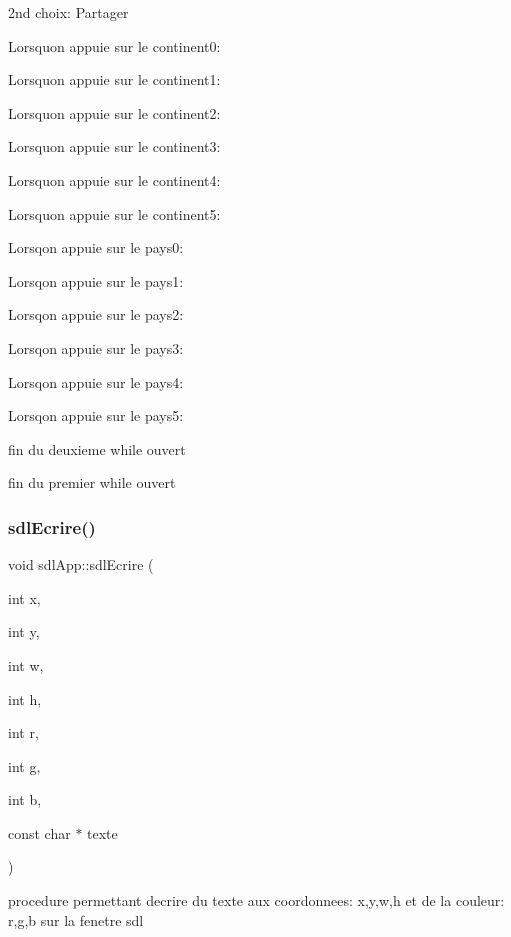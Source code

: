 2nd choix\+: Partager

Lorsqu\textquotesingle{}on appuie sur le continent0\+:

Lorsqu\textquotesingle{}on appuie sur le continent1\+:

Lorsqu\textquotesingle{}on appuie sur le continent2\+:

Lorsqu\textquotesingle{}on appuie sur le continent3\+:

Lorsqu\textquotesingle{}on appuie sur le continent4\+:

Lorsqu\textquotesingle{}on appuie sur le continent5\+:

Lorsq\textquotesingle{}on appuie sur le pays0\+:

Lorsq\textquotesingle{}on appuie sur le pays1\+:

Lorsq\textquotesingle{}on appuie sur le pays2\+:

Lorsq\textquotesingle{}on appuie sur le pays3\+:

Lorsq\textquotesingle{}on appuie sur le pays4\+:

Lorsq\textquotesingle{}on appuie sur le pays5\+:

fin du deuxieme while ouvert

fin du premier while ouvert \mbox{\label{classsdlApp_ae4db12d802dc7b8dd0a6b284897917bf}} 
\subsubsection{\texorpdfstring{sdl\+Ecrire()}{sdlEcrire()}}
{\footnotesize\ttfamily void sdl\+App\+::sdl\+Ecrire (\begin{DoxyParamCaption}\item[{int}]{x,  }\item[{int}]{y,  }\item[{int}]{w,  }\item[{int}]{h,  }\item[{int}]{r,  }\item[{int}]{g,  }\item[{int}]{b,  }\item[{const char $\ast$}]{texte }\end{DoxyParamCaption})}



procedure permettant d\textquotesingle{}ecrire du texte aux coordonnees\+: x,y,w,h et de la couleur\+: r,g,b sur la fenetre sdl 


